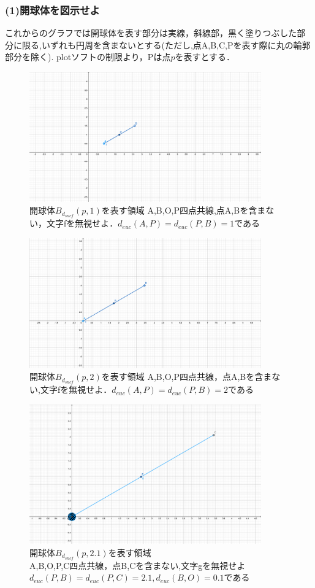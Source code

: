 \documentclass{jreport}
\newcommand{\de}{d_{euc}}
\newcommand{\ds}{d_{sncf}}
\newcommand{\bs}{B_{\ds}}
\begin{document}
\subsubsection{(1)開球体を図示せよ}
これからのグラフでは開球体を表す部分は実線，斜線部，黒く塗りつぶした部分に限る,いずれも円周を含まないとする(ただし,点A,B,C,Pを表す際に丸の輪郭部分を除く).
plotソフトの制限より，Pは点$p$を表すとする．\\
\begin{figure}[H]
\centering
\includegraphics[width=10cm]{1.pdf}
\caption{開球体$\bs(p,1)$を表す領域\newline
	{\footnotesize A,B,O,P四点共線,点A,Bを含まない，文字fを無視せよ．$\de(A,P)=\de(P,B)=1$である}}
\end{figure}
\begin{figure}[H]
\centering
\includegraphics[width=10cm]{2.pdf}
\caption{開球体$\bs(p,2)$を表す領域\newline
	{\footnotesize A,B,O,P四点共線，点A,Bを含まない,文字fを無視せよ．$\de(A,P)=\de(P,B)=2$である}}
\end{figure}
\begin{figure}[H]
\centering
\includegraphics[width=10cm]{3.pdf}
\caption{開球体$\bs(p,2.1)$を表す領域\\
	{\footnotesize A,B,O,P,C四点共線，点B,Cを含まない,文字gを無視せよ$\de(P,B)=\de(P,C)=2.1,\de(B,O)=0.1$である}}
\end{figure}
\end{document}
